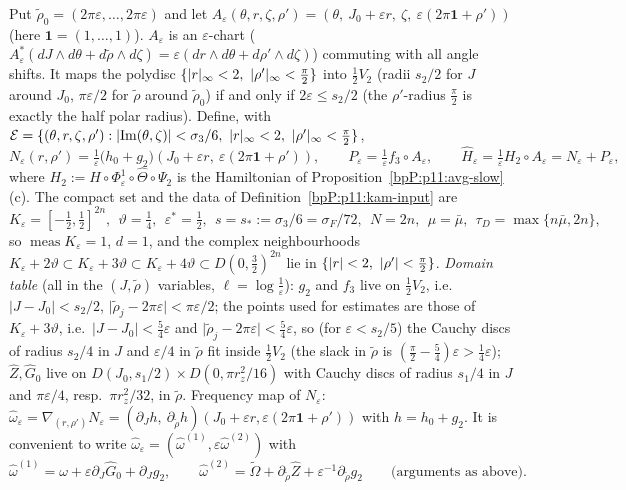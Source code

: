 Put $\tilde\rho_0=(2\pi\varepsilon,\dots,2\pi\varepsilon)$ and let $A_\varepsilon(\theta,r,\zeta,\rho')=(\theta,\ J_0+\varepsilon r,\ \zeta,\ \varepsilon(2\pi\mathbf1+\rho'))$ (here $\mathbf 1=(1,\dots,1)$). $A_\varepsilon$ is an $\varepsilon$-chart ($A_\varepsilon^*(dJ\wedge d\theta+d\tilde\rho\wedge d\zeta)=\varepsilon(dr\wedge d\theta+d\rho'\wedge d\zeta)$) commuting with all angle shifts. It maps the polydisc $\{\abs r_\infty<2,\ \abs{\rho'}_\infty<\frac\pi2\}$ into $\tfrac12V_2$ (radii $s_2/2$ for $J$ around $J_0$, $\pi\varepsilon/2$ for $\tilde\rho$ around $\tilde\rho_0$) if and only if $2\varepsilon\le s_2/2$ (the $\rho'$-radius $\frac\pi2$ is exactly the half polar radius). Define, with $\mathcal E=\{(\theta,r,\zeta,\rho'):\abs{\operatorname{Im}(\theta,\zeta)}<\sigma_3/6,\ \abs r_\infty<2,\ \abs{\rho'}_\infty<\frac\pi2\}$,
\[N_\varepsilon(r,\rho')=\tfrac1\varepsilon\bigl(h_0+g_2\bigr)(J_0+\varepsilon r,\ \varepsilon(2\pi\mathbf1+\rho')),\qquad P_\varepsilon=\tfrac1\varepsilon f_3\circ A_\varepsilon,\qquad\hat H_\varepsilon=\tfrac1\varepsilon H_2\circ A_\varepsilon=N_\varepsilon+P_\varepsilon ,\]
where $H_2:=H\circ\Phi^1_\varepsilon\circ\hat\Theta\circ\Psi_2$ is the Hamiltonian of Proposition~\ref{bpP:p11:avg-slow}(c). The compact set and the data of Definition~\ref{bpP:p11:kam-input} are
\[K_\varepsilon=[-\tfrac12,\tfrac12]^{2n},\ \ \vartheta=\tfrac14,\ \ \varepsilon^*=\tfrac12,\ \ s=s_*:=\sigma_3/6=\sigma_F/72,\ \ N=2n,\ \ \mu=\bar\mu,\ \ \tau_D=\max\{n\bar\mu,2n\},\]
so $\operatorname{meas}K_\varepsilon=1$, $d=1$, and the complex neighbourhoods $K_\varepsilon+2\vartheta\subset K_\varepsilon+3\vartheta\subset K_\varepsilon+4\vartheta\subset D(0,\frac32)^{2n}$ lie in $\{\abs r<2,\ \abs{\rho'}<\frac\pi2\}$. \emph{Domain table} (all in the $(J,\tilde\rho)$ variables, $\ell=\log\frac1\varepsilon$): $g_2$ and $f_3$ live on $\frac12V_2$, i.e.\ $\lvert J-J_0\rvert<s_2/2$, $\lvert\tilde\rho_j-2\pi\varepsilon\rvert<\pi\varepsilon/2$; the points used for estimates are those of $K_\varepsilon+3\vartheta$, i.e.\ $\lvert J-J_0\rvert<\frac54\varepsilon$ and $\lvert\tilde\rho_j-2\pi\varepsilon\rvert<\frac54\varepsilon$, so (for $\varepsilon<s_2/5$) the Cauchy discs of radius $s_2/4$ in $J$ and $\varepsilon/4$ in $\tilde\rho$ fit inside $\frac12V_2$ (the slack in $\tilde\rho$ is $(\frac\pi2-\frac54)\varepsilon>\frac14\varepsilon$); $\hat Z,\hat G_0$ live on $D(J_0,s_1/2)\times D(0,\pi r_z^2/16)$ with Cauchy discs of radius $s_1/4$ in $J$ and $\pi\varepsilon/4$, resp.\ $\pi r_z^2/32$, in $\tilde\rho$. Frequency map of $N_\varepsilon$: $\hat\omega_\varepsilon=\nabla_{(r,\rho')}N_\varepsilon=(\partial_Jh,\ \partial_{\tilde\rho}h)(J_0+\varepsilon r,\varepsilon(2\pi\mathbf1+\rho'))$ with $h=h_0+g_2$. It is convenient to write $\hat\omega_\varepsilon=(\hat\omega^{(1)},\varepsilon\hat\omega^{(2)})$ with
\[\hat\omega^{(1)}=\omega+\varepsilon\partial_J\hat G_0+\partial_Jg_2,\qquad\hat\omega^{(2)}=\tilde\Omega+\partial_{\tilde\rho}\hat Z+\varepsilon^{-1}\partial_{\tilde\rho}g_2\qquad\text{(arguments as above).}\]

